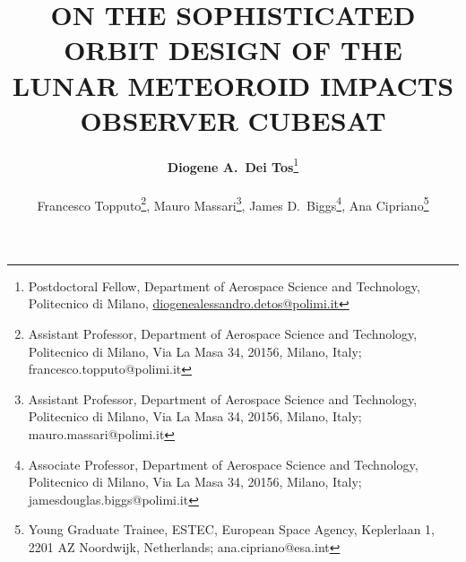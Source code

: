 
\title[IAC2018]{\large ON THE SOPHISTICATED ORBIT DESIGN OF THE LUNAR METEOROID IMPACTS OBSERVER CUBESAT}


\author{\large {\bfseries Diogene A.\ Dei Tos}\thanks{Postdoctoral Fellow, Department of Aerospace Science and Technology, Politecnico di Milano, \href{mailto:diogenealessandro.detos@polimi.it}{diogenealessandro.detos@polimi.it}}
\\~\\
\large {Francesco Topputo}\thanks{Assistant Professor, Department of Aerospace Science and Technology, Politecnico di Milano, Via La Masa 34, 20156, Milano, Italy; francesco.topputo@polimi.it},
\large {Mauro Massari}\thanks{Assistant Professor, Department of Aerospace Science and Technology, Politecnico di Milano, Via La Masa 34, 20156, Milano, Italy; mauro.massari@polimi.it},
\large {James D.\ Biggs}\thanks{Associate Professor, Department of Aerospace Science and Technology, Politecnico di Milano, Via La Masa 34, 20156, Milano, Italy; jamesdouglas.biggs@polimi.it},
\large {Ana Cipriano}\thanks{Young Graduate Trainee, ESTEC, European Space Agency, Keplerlaan 1, 2201 AZ Noordwijk, Netherlands; ana.cipriano@esa.int}}